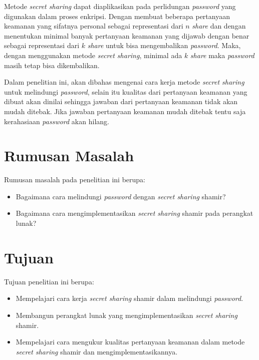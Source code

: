 Metode \textit{secret sharing} dapat diaplikasikan pada perlidungan \textit{password} yang digunakan dalam proses enkripsi. Dengan membuat beberapa pertanyaan keamanan yang sifatnya personal sebagai representasi dari \begin{math}n\end{math} \textit{share} dan dengan menentukan minimal banyak pertanyaan keamanan yang dijawab dengan benar sebagai representasi dari \begin{math}k\end{math} \textit{share} untuk bisa mengembalikan \textit{password}. Maka, dengan menggunakan metode \textit{secret sharing}, minimal ada \begin{math}k\end{math} \textit{share} maka \textit{password} masih tetap bisa dikembalikan.

Dalam penelitian ini, akan dibahas mengenai cara kerja metode \textit{secret sharing} untuk melindungi \textit{password}, selain itu kualitas dari pertanyaan keamanan yang dibuat akan dinilai sehingga jawaban dari pertanyaan keamanan tidak akan mudah ditebak. Jika jawaban pertanyaan keamanan mudah ditebak tentu saja kerahasiaan \textit{password} akan hilang.

\section{\textbf{Rumusan Masalah}}
\label{sec:rumusan masalah}

Rumusan masalah pada penelitian ini berupa:
\begin{itemize}
	\item Bagaimana cara melindungi \textit{password} dengan \textit{secret sharing} shamir?
	\item Bagaimana cara mengimplementasikan {\it secret sharing} shamir pada perangkat lunak?
\end{itemize}

\section{\textbf{Tujuan}}
\label{sec:tujuan}

Tujuan penelitian ini berupa:
\begin{itemize}
	\item Mempelajari cara kerja {\it secret sharing} shamir dalam melindungi {\it password}.
	\item Membangun perangkat lunak yang mengimplementasikan {\it secret sharing} shamir.
	\item Mempelajari cara mengukur kualitas pertanyaan keamanan dalam metode {\it secret sharing} shamir dan mengimplementasikannya.
\end{itemize}

